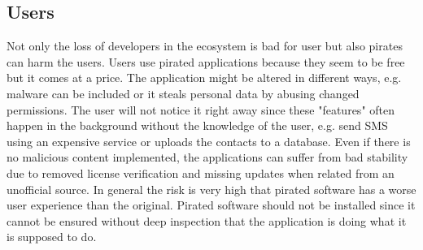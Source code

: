 \subsection{Users} \label{subsection:foundation-piracy-users}
Not only the loss of developers in the ecosystem is bad for user but also pirates can harm the users.
Users use pirated applications because they seem to be free but it comes at a price.
The application might be altered in different ways, e.g. malware can be included or it steals personal data by abusing changed permissions.
The user will not notice it right away since these "features" often happen in the background without the knowledge of the user, e.g. send SMS using an expensive service or uploads the contacts to a database.
Even if there is no malicious content implemented, the applications can suffer from bad stability due to removed license verification and missing updates when related from an unofficial source.
In general the risk is very high that pirated software has a worse user experience than the original.
Pirated software should not be installed since it cannot be ensured without deep inspection that the application is doing what it is supposed to do. \cite{bitdefenderPlagiarism}\cite{lierschDeveloperThreats}
\newline





